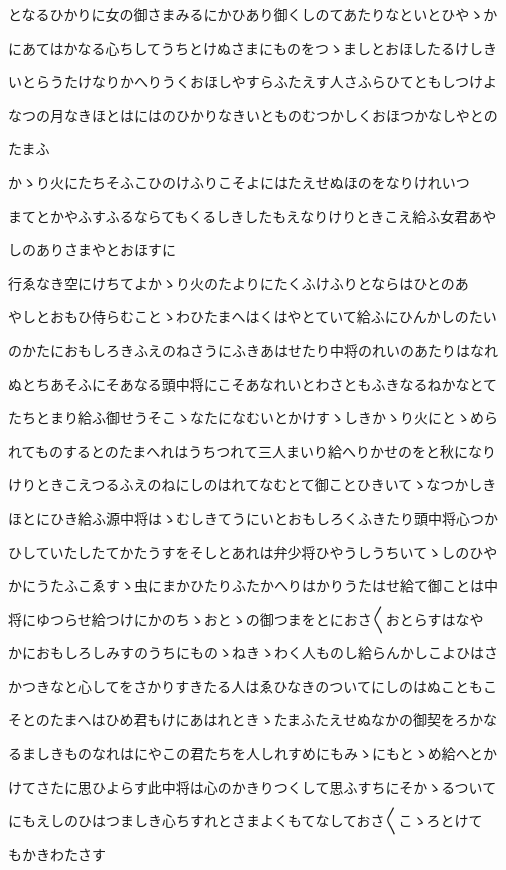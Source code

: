 \documentclass[a4paper,11pt,landscape]{ltjtarticle}
\begin{document}
\par\medskip
となるひかりに女の御さまみるにかひあり御くしのてあたりなといとひやゝか
\par\medskip
にあてはかなる心ちしてうちとけぬさまにものをつゝましとおほしたるけしき
\par\medskip
いとらうたけなりかへりうくおほしやすらふたえす人さふらひてともしつけよ
\par\medskip
なつの月なきほとはにはのひかりなきいとものむつかしくおほつかなしやとの
\par\medskip
たまふ
\par\medskip
かゝり火にたちそふこひのけふりこそよにはたえせぬほのをなりけれいつ
\par\medskip
まてとかやふすふるならてもくるしきしたもえなりけりときこえ給ふ女君あや
\par\medskip
しのありさまやとおほすに
\par\medskip
行ゑなき空にけちてよかゝり火のたよりにたくふけふりとならはひとのあ
\par\medskip
やしとおもひ侍らむことゝわひたまへはくはやとていて給ふにひんかしのたい
\par\medskip
のかたにおもしろきふえのねさうにふきあはせたり中将のれいのあたりはなれ
\par\medskip
ぬとちあそふにそあなる頭中将にこそあなれいとわさともふきなるねかなとて
\par\medskip
たちとまり給ふ御せうそこゝなたになむいとかけすゝしきかゝり火にとゝめら
\par\medskip
れてものするとのたまへれはうちつれて三人まいり給へりかせのをと秋になり
\par\medskip
けりときこえつるふえのねにしのはれてなむとて御ことひきいてゝなつかしき
\par\medskip
ほとにひき給ふ源中将はゝむしきてうにいとおもしろくふきたり頭中将心つか
\par\medskip
ひしていたしたてかたうすをそしとあれは弁少将ひやうしうちいてゝしのひや
\par\medskip
かにうたふこゑすゝ虫にまかひたりふたかへりはかりうたはせ給て御ことは中
\par\medskip
将にゆつらせ給つけにかのちゝおとゝの御つまをとにおさ〱おとらすはなや
\par\medskip
かにおもしろしみすのうちにものゝねきゝわく人ものし給らんかしこよひはさ
\par\medskip
かつきなと心してをさかりすきたる人はゑひなきのついてにしのはぬこともこ
\par\medskip
そとのたまへはひめ君もけにあはれときゝたまふたえせぬなかの御契をろかな
\par\medskip
るましきものなれはにやこの君たちを人しれすめにもみゝにもとゝめ給へとか
\par\medskip
けてさたに思ひよらす此中将は心のかきりつくして思ふすちにそかゝるついて
\par\medskip
にもえしのひはつましき心ちすれとさまよくもてなしておさ〱こゝろとけて
\par\medskip
もかきわたさす
\par\medskip
\end{document}
